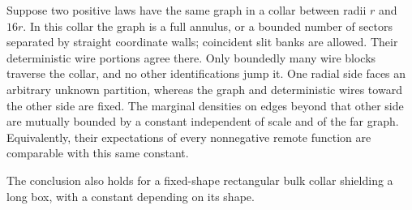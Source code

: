 \begin{lemma}\label{prelim:collar}
Suppose two positive laws have the same graph in a collar between radii
$r$ and $16r$. In this collar the graph is a full annulus, or a bounded
number of sectors separated by straight coordinate walls; coincident slit
banks are allowed. Their deterministic wire portions agree there. Only
boundedly many wire blocks traverse the collar, and no other
identifications jump it. One radial side faces an arbitrary unknown
partition, whereas the graph and deterministic wires toward the other
side are fixed. The marginal densities on edges beyond that other side
are mutually bounded by a constant independent of scale and of the far
graph. Equivalently, their expectations of every nonnegative remote
function are comparable with this same constant.

The conclusion also holds for a fixed-shape rectangular bulk collar
shielding a long box, with a constant depending on its shape.
\end{lemma}

